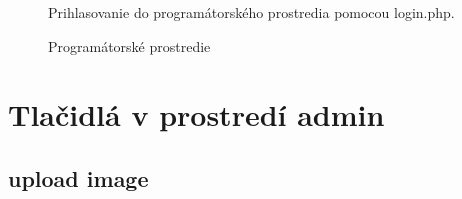 \pagebreak

\begin{figure}[!tbh]
\centering
\setlength{\fboxsep}{0pt}%
\setlength{\fboxrule}{1pt}%
\caption{Prihlasovanie do programátorského prostredia pomocou login.php.}\label{OBRAZOK 1.8}
\end{figure}

\begin{figure}[!tbh]
\centering
\setlength{\fboxsep}{0pt}%
\setlength{\fboxrule}{1pt}%
\caption{Programátorské prostredie}\label{OBRAZOK 1.9}
\end{figure}

\pagebreak

\section{Tlačidlá v prostredí admin}
\subsection{upload image}

